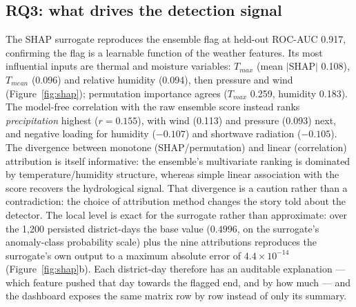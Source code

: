 \documentclass[preprint,12pt]{elsarticle}
\begin{document}
\subsection{RQ3: what drives the detection signal}
\label{sec:rq3}
The SHAP surrogate reproduces the ensemble flag at held-out ROC-AUC 0.917,
confirming the flag is a learnable function of the weather features.
Its most influential inputs are thermal and moisture variables:
$T_{max}$ (mean $|$SHAP$|$ 0.108), $T_{mean}$ (0.096) and relative humidity
(0.094), then pressure and wind (Figure~\ref{fig:shap}); permutation importance
agrees ($T_{max}$ 0.259, humidity 0.183). The model-free correlation with the
raw ensemble score instead ranks \emph{precipitation} highest ($r=0.155$), with
wind (0.113) and pressure (0.093) next, and negative loading for humidity
($-0.107$) and shortwave radiation ($-0.105$). The divergence between
monotone (SHAP/permutation) and linear (correlation) attribution is itself
informative: the ensemble's multivariate ranking is dominated by
temperature/humidity structure, whereas simple linear association with the score
recovers the hydrological signal. That divergence is a caution rather than a
contradiction: the choice of attribution method changes the story told about the
detector.
The local level is exact for the surrogate rather than approximate: over the
1{,}200 persisted district-days the base value ($0.4996$, on the surrogate's
anomaly-class probability scale) plus the nine attributions reproduces the
surrogate's own output to a maximum absolute error of
$4.4\times10^{-14}$ (Figure~\ref{fig:shap}b). Each district-day therefore has an
auditable explanation --- which feature pushed that day towards the flagged end,
and by how much --- and the dashboard exposes the same matrix row by row instead
of only its summary.
\end{document}
